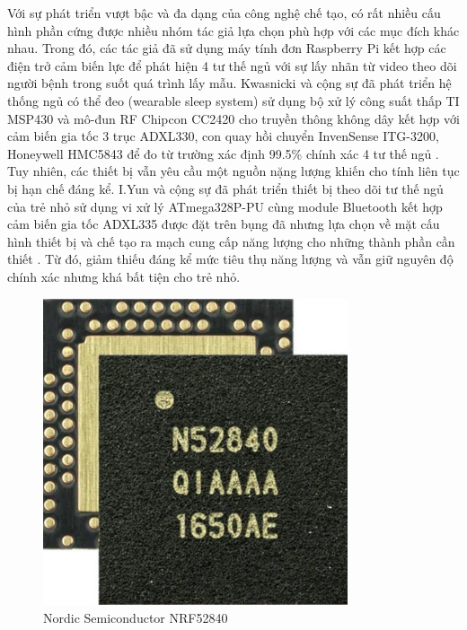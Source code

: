 Với sự phát triển vượt bậc và đa dạng của công nghệ chế tạo, có rất nhiều cấu hình phần cứng được nhiều nhóm tác giả lựa chọn phù hợp với các mục đích khác nhau. Trong đó, \cite{p_1} các tác giả đã sử dụng máy tính đơn Raspberry Pi kết hợp các điện trở cảm biến lực để phát hiện 4 tư thế ngủ với sự lấy nhãn từ video theo dõi người bệnh trong suốt quá trình lấy mẫu. Kwasnicki và cộng sự đã phát triển hệ thống ngủ có thể đeo (wearable sleep system) sử dụng bộ xử lý công suất thấp TI MSP430 và mô-đun RF Chipcon CC2420 cho truyền thông không dây kết hợp với cảm biến gia tốc 3 trục ADXL330, con quay hồi chuyển InvenSense ITG-3200, Honeywell HMC5843 để đo từ trường xác định 99.5\% chính xác 4 tư thế ngủ \cite{p_2}. Tuy nhiên, các thiết bị vẫn yêu cầu một nguồn nặng lượng khiến cho tính liên tục bị hạn chế đáng kể. I.Yun và cộng sự đã phát triển thiết bị theo dõi tư thế ngủ của trẻ nhỏ sử dụng vi xử lý ATmega328P-PU cùng module Bluetooth kết hợp cảm biến gia tốc ADXL335 được đặt trên bụng đã nhưng lựa chọn về mặt cấu hình thiết bị và chế tạo ra mạch cung cấp năng lượng cho những thành phần cần thiết \cite{p_3}. Từ đó, giảm thiếu đáng kể mức tiêu thụ năng lượng và vẫn giữ nguyên độ chính xác nhưng khá bất tiện cho trẻ nhỏ.

\begin{figure}[!ht]
		\centering
 		\includegraphics[width=0.8\textwidth]{images/NRF52840-QFA_SPL.jpg}
		\caption{Nordic Semiconductor NRF52840}
		\label{lis}
\end{figure}

